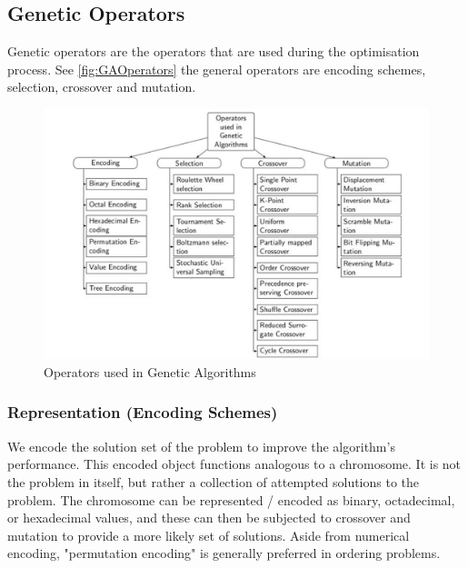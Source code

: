 
\subsection{Genetic Operators}
Genetic operators are the operators that are used during the optimisation process. See \autoref{fig:GAOperators} the general operators are encoding schemes, selection, crossover and mutation. 

\begin{figure}[H]
    \centering
    \includegraphics[scale=0.4]{images/GA_Operators.png}
    \caption{Operators used in Genetic Algorithms \citep{Katoch2021}}
    \label{fig:GAOperators}
\end{figure}

\subsubsection{Representation (Encoding Schemes)}
We encode the solution set of the problem to improve the algorithm's performance. This encoded object functions analogous to a chromosome. It is not the problem in itself, but rather a collection of attempted solutions to the problem. The chromosome can be represented / encoded as binary, octadecimal, or hexadecimal values, and these can then be subjected to crossover and mutation to provide a more likely set of solutions. Aside from numerical encoding, "permutation encoding" is generally preferred in ordering problems.

